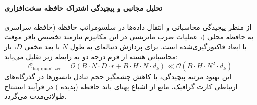 \paragraph{تحلیل مجانبی و پیچیدگی اشتراک حافظه سخت‌افزاری}
از منظر پیچیدگی محاسباتی و انتقال داده‌ها در سلسومراتب حافظه (حافظه سراسری  به حافظه محلی )، عملیات ضرب ماتریسی در این مکانیزم نیازمند تخصیص بافر موقت با ابعاد فاکتورگیری‌شده است. برای پردازش دنباله‌ای به طول $N$ با بعد مخفی $D$، بار محاسباتی هسته از فرم درجه دو به رابطه زیر تقلیل می‌یابد:
\begin{equation}
\label{eq:complexity_faq_quantizer}
\mathcal{C}_{\text{faq\_quantizer}} = \mathcal{O}\left( B \cdot N \cdot D \cdot r + B \cdot H \cdot N \cdot d_k \right) \ll \mathcal{O}\left( B \cdot H \cdot N^2 \cdot d_k \right)
\end{equation}
این بهبود مرتبه پیچیدگی، با کاهش چشمگیر حجم تبادل تانسورها در گذرگاه‌های ارتباطی کارت گرافیک، مانع از اشباع پهنای باند حافظه (پدیده ) در فرآیند استنتاج طولانی‌مدت می‌گردد.

